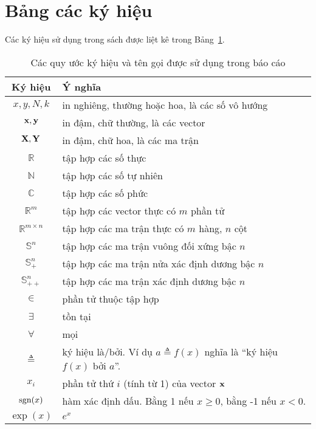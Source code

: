 
\def\R{\mathbb{R}}
\newpage
\section{Bảng các ký hiệu}
Các ký hiệu sử dụng trong sách được liệt kê trong Bảng~\ref{tab:notation}.

\begin{table}[h]
    \caption{Các quy ước ký hiệu và tên gọi được sử dụng trong báo cáo}
    \label{tab:notation}
    \centering
    \begin{tabular}{|c|l|}
    \hline 
    Ký hiệu & Ý nghĩa  \\ \hline 
    \hline 
    $x, y, N, k$ & in nghiêng, thường hoặc hoa, là các số vô hướng \\ \hline
    $\mathbf{x}, \mathbf{y}$ & in đậm, chữ thường, là các vector  \\ \hline
    $\mathbf{X}, \mathbf{Y}$ & in đậm, chữ hoa, là các ma trận  \\ \hline
    $\R$ & tập hợp các số thực \\ \hline 
    $\mathbb{N}$ & tập hợp các số tự nhiên \\ \hline 
    $\mathbb{C}$ & tập hợp các số phức \\ \hline 
    $\R^{m}$ & tập hợp các vector thực có $m$ phần tử \\ \hline 
    $\R^{m\times n}$ &tập hợp các ma trận thực có $m$ hàng, $n$ cột \\ \hline
    $\mathbb{S}^n$ & tập hợp các ma trận vuông đối xứng bậc $n$ \\ \hline 
    $\mathbb{S}^n_{+}$ & tập hợp các ma trận nửa xác định dương bậc $n$ \\
    \hline 
    $\mathbb{S}^n_{++}$ & tập hợp các ma trận xác định dương bậc $n$ \\ \hline 
    $ \in $ & phần tử thuộc tập hợp \\ \hline 
    $ \exists $ & tồn tại \\ \hline 
    $ \forall $ & mọi \\ \hline 
    $ \triangleq$ & ký hiệu là/bởi. Ví dụ $a\triangleq f(x)$ nghĩa là ``ký hiệu
    $f(x)$ bởi $a$''. \\ \hline 
    $x_i$ & phần tử thứ $i$ (tính từ 1) của vector $\mathbf{x}$ \\ \hline 
    $\text{sgn}(x)$ & hàm xác định dấu. Bằng 1 nếu $x \geq 0$, bằng -1 nếu $x < 0$. \\ \hline
    $\exp(x)$ & $e^x$ \\ \hline

\end{tabular}
\end{table}
